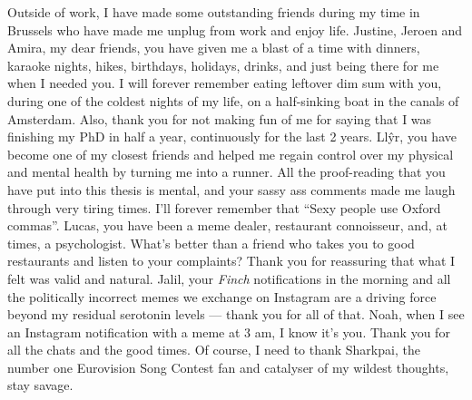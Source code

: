 Outside of work, I have made some outstanding friends during my time in Brussels who have made me unplug from work and enjoy life. Justine, Jeroen and Amira, my dear friends, you have given me a blast of a time with dinners, karaoke nights, hikes, birthdays, holidays, drinks, and just being there for me when I needed you. I will forever remember eating leftover dim sum with you, during one of the coldest nights of my life, on a half-sinking boat in the canals of Amsterdam. Also, thank you for not making fun of me for saying that I was finishing my PhD in half a year, continuously for the last 2 years. Llŷr, you have become one of my closest friends and helped me regain control over my physical and mental health by turning me into a runner. All the proof-reading that you have put into this thesis is mental, and your sassy ass comments made me laugh through very tiring times. I'll forever remember that ``Sexy people use Oxford commas''. Lucas, you have been a meme dealer, restaurant connoisseur, and, at times, a psychologist. What's better than a friend who takes you to good restaurants and listen to your complaints? Thank you for reassuring that what I felt was valid and natural. Jalil, your \textit{Finch} notifications in the morning and all the politically incorrect memes we exchange on Instagram are a driving force beyond my residual serotonin levels --- thank you for all of that. Noah, when I see an Instagram notification with a meme at 3 am, I know it's you. Thank you for all the chats and the good times. Of course, I need to thank Sharkpai, the number one Eurovision Song Contest fan and catalyser of my wildest thoughts, stay savage.

